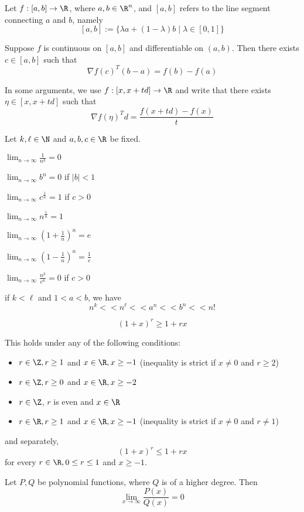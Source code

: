 Let $f:[a,b]\to\R$, where $a,b\in\R^n$, and $[a,b]$ refers to the line
segment connecting $a$ and $b$, namely
$$
	[a,b]:=\{\lambda a+(1-\lambda)b\mid\lambda\in[0,1]\}
$$

Suppose $f$ is continuous on $[a,b]$ and differentiable on $(a,b)$.
Then there exists $c\in[a,b]$ such that
$$
	\nabla f(c)^T(b-a)=f(b)-f(a)
$$

In some arguments, we use $f:[x,x+td]\to\R$ and write that there
exists $\eta\in[x,x+td]$ such that
$$
	\nabla f(\eta)^Td=\frac{f(x+td)-f(x)}t
$$

\label{ffc8953}

Let $k,\ell\in\N$ and $a,b,c\in\R$ be fixed.
\begin{enumerata}
	\def\li{\displaystyle\lim_{n\to\infty}}
	\item $\li\frac1{n^k}=0$
	\item $\li b^n=0$ \quad if \quad $|b|<1$
	\item $\li c^{\frac1n}=1$ \quad if \quad $c>0$
	\item $\li n^{\frac1n}=1$
	\item $\li \left(1+\frac1n\right)^n=e$
	\item $\li \left(1-\frac1n\right)^n=\frac1e$
	\item $\li \frac{n^k}{c^n}=0$ \quad if \quad $c>0$
\end{enumerata}

if $k<\ell$ and $1<a<b$, we have
$$
	n^k << n^\ell << a^n << b^n << n!
$$

\label{d44713f}
$$
	(1+x)^r\geq 1+rx
$$

This holds under any of the following conditions:
\begin{itemize}
	\item $r\in\Z,r\geq1$ and $x\in\R,x\geq-1$ (inequality is strict if
	      $x\neq0$ and $r\geq2$)
	\item $r\in\Z,r\geq0$ and $x\in\R,x\geq-2$
	\item $r\in\Z$, $r$ is even and $x\in\R$
	\item $r\in\R,r\geq1$ and $x\in\R,x\geq-1$ (inequality is strict if
	      $x\neq0$ and $r\neq1$)
\end{itemize}

and separately,
$$
	(1+x)^r\leq 1+rx
$$
for every $r\in\R,0\leq r\leq 1$ and $x\geq-1$.

\label{ccfddb1}

Let $P,Q$ be polynomial functions, where $Q$ is of a higher degree.
Then
$$
	\lim_{x\to\infty}\frac{P(x)}{Q(x)}=0
$$

